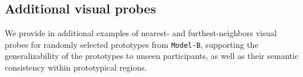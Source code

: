 \documentclass[runningheads]{llncs}
\begin{document}





\subsection{Additional visual probes}
We provide in  additional examples of nearest- and furthest-neighbors visual probes for randomly selected prototypes from \texttt{Model-B}, supporting the generalizability of the prototypes to unseen participants, as well as their semantic consistency within prototypical regions.
\end{document}
